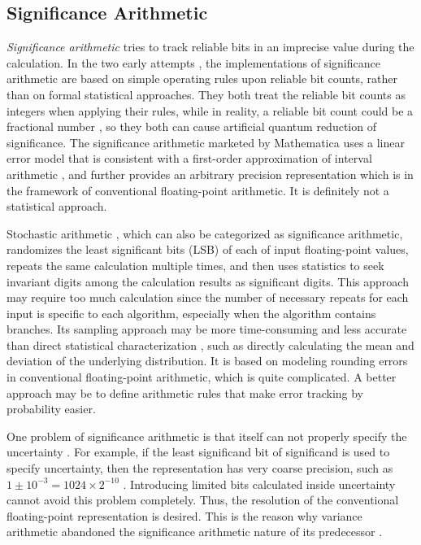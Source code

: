 \documentclass[twoside]{article}
\numberwithin{equation}{section}
\begin{document}
\subsection{Significance Arithmetic}

\emph{Significance arithmetic} \cite{Significance_Arithmetic} tries to track reliable bits in an imprecise value during the calculation.  
In the two early attempts \cite{Digital_Significance_Arithmetic}\cite{Unnormalized_Arithmetic}, the implementations of significance arithmetic are based on simple operating rules upon reliable bit counts, rather than on formal statistical approaches.  
They both treat the reliable bit counts as integers when applying their rules, while in reality, a reliable bit count could be a fractional number \cite{Mathematica_Significance_Arithmetic}, so they both can cause artificial quantum reduction of significance.  
The significance arithmetic marketed by Mathematica \cite{Mathematica_Significance_Arithmetic} uses a linear error model that is consistent with a first-order approximation of interval arithmetic \cite{Precise_Numerical_Methods}\cite{Interval_Analysis_Theory_Applications}\cite{Interval_Arithmetic}, and further provides an arbitrary precision representation which is in the framework of  conventional floating-point arithmetic. 
It is definitely not a statistical approach. 

Stochastic arithmetic \cite{Stochastic_Arithmetic} \cite{CADNA_library}, which can also be categorized as significance arithmetic, randomizes the least significant bits (LSB) of each of input floating-point values, repeats the same calculation multiple times, and then uses statistics to seek invariant digits among the calculation results as significant digits.  
This approach may require too much calculation since the number of necessary repeats for each input is specific to each algorithm, especially when the algorithm contains branches.  
Its sampling approach may be more time-consuming and less accurate than direct statistical characterization \cite{Probability_Statistics}, such as directly calculating the mean and deviation of the underlying distribution.  
It is based on modeling rounding errors in conventional floating-point arithmetic, which is quite complicated.  
A better approach may be to define arithmetic rules that make error tracking by probability easier.

One problem of significance arithmetic is that itself can not properly specify the uncertainty \cite{Prev_Precision_Arithmetic}.
For example, if the least significand bit of significand is used to specify uncertainty, then the representation has very coarse precision, such as $1 \pm 10^{-3} = 1024 \times 2^{-10}$  \cite{Prev_Precision_Arithmetic}.
Introducing limited bits calculated inside uncertainty cannot avoid this problem completely.
Thus, the resolution of the conventional floating-point representation is desired.
This is the reason why variance arithmetic abandoned the significance arithmetic nature of its predecessor \cite{Prev_Precision_Arithmetic}.
\end{document}
